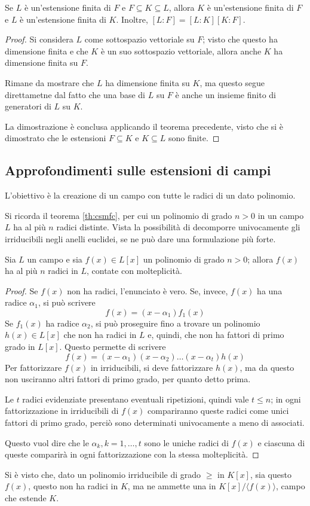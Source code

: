 \documentclass[11pt, a4paper]{scrartcl}
\theoremstyle{definition}
\numberwithin{esempio}{section}
\theoremstyle{definition}
\numberwithin{obs}{section}
\numberwithin{nota}{section}
\numberwithin{equation}{subsection}
\begin{document}
\begin{corollario}
	{}{}
	Se $L$ \`e un'estensione finita di $F$ e $F \subseteq K \subseteq L$, allora $K$ \`e un'estensione finita di $F$ e $L$ \`e un'estensione finita di $K$.
	Inoltre, $[L:F]=[L:K][K:F]$.
	\begin{proof}
		Si considera $L$ come sottospazio vettoriale su $F$; visto che questo ha dimensione finita e che $K$ \`e un suo sottospazio vettoriale, allora anche $K$ ha dimensione finita su $F$.

		Rimane da mostrare che $L$ ha dimensione finita su $K$, ma questo segue direttametne dal fatto che una base di $L$ su $F$ \`e anche un insieme finito di generatori di $L$ su $K$.

		La dimostrazione \`e conclusa applicando il teorema precedente, visto che si \`e dimostrato che le estensioni $F\subseteq K$ e $K \subseteq L$ sono finite.
	\end{proof}
\end{corollario}
\subsection{Approfondimenti sulle estensioni di campi}
L'obiettivo \`e la creazione di un campo con tutte le radici di un dato polinomio.

Si ricorda il teorema \ref{th:csmfc}, per cui un polinomio di grado $n>0$ in un campo $L$ ha al pi\`u $n$ radici distinte.
Vista la possibilit\`a di decomporre univocamente gli irriducibili negli anelli euclidei, se ne pu\`o dare una formulazione pi\`u forte.
\begin{teorema}
	{}{}
	Sia $L$ un campo e sia $f(x) \in L[x]$ un polinomio di grado $n > 0$; allora $f(x)$ ha al pi\`u $n$ radici in $L$, contate con molteplicit\`a.
	\begin{proof}
		Se $f(x)$ non ha radici, l'enunciato \`e vero.
		Se, invece, $f(x)$ ha una radice $\alpha  _1$, si pu\`o scrivere 
		\[
		f(x) = (x-\alpha _1)f_1(x)
		\] 
		Se $f_1(x)$ ha radice $\alpha _2$, si pu\`o proseguire fino a trovare un polinomio $h(x) \in L[x]$ che non ha radici in $L$ e, quindi, che non ha fattori di primo grado in $L[x]$.
		Questo permette di scrivere
		\[
		f(x) = (x-\alpha_1) (x-\alpha _2) \ldots (x-\alpha _t) h(x)
		\] 
		Per fattorizzare $f(x)$ in irriducibili, si deve fattorizzare $h(x)$, ma da questo non usciranno altri fattori di primo grado, per quanto detto prima.

		Le $t$ radici evidenziate presentano eventuali ripetizioni, quindi vale $t \le  n$; in ogni fattorizzazione in irriducibili di $f(x)$ compariranno queste radici come unici fattori di primo grado, perci\`o sono determinati univocamente a meno di associati.

		Questo vuol dire che le $\alpha _k, k =1,\ldots,t$ sono le uniche radici di $f(x)$ e ciascuna di queste comparir\`a in ogni fattorizzazione con la stessa molteplicit\`a.
	\end{proof}
\end{teorema}
\noindent Si \`e visto che, dato un polinomio irriducibile di grado $\ge $ in $K[x]$, sia questo $f(x)$, questo non ha radici in $K$, ma ne ammette una in $K[x] / \langle f(x) \rangle$, campo che estende $K$.
\end{document}

